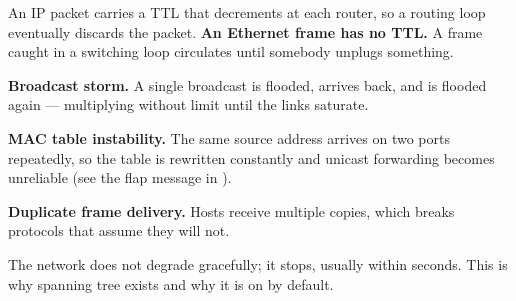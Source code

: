 \begin{conceptbox}
An IP packet carries a TTL that decrements at each router, so a routing loop
eventually discards the packet. \textbf{An Ethernet frame has no TTL.} A frame
caught in a switching loop circulates until somebody unplugs something.

\begin{tight}
  \item \textbf{Broadcast storm.} A single broadcast is flooded, arrives back,
        and is flooded again --- multiplying without limit until the links
        saturate.
  \item \textbf{MAC table instability.} The same source address arrives on two
        ports repeatedly, so the table is rewritten constantly and unicast
        forwarding becomes unreliable (see the flap message in ).
  \item \textbf{Duplicate frame delivery.} Hosts receive multiple copies, which
        breaks protocols that assume they will not.
\end{tight}
The network does not degrade gracefully; it stops, usually within seconds. This
is why spanning tree exists and why it is on by default.
\end{conceptbox}

